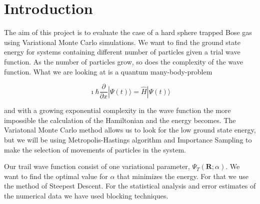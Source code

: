 \section{Introduction}
The aim of this project is to evaluate the case of a hard sphere trapped Bose gas using Variational Monte Carlo simulations. We want to find the ground state energy for systems containing different number of particles given a trial wave function. As the number of particles grow, so does the complexity of the wave function.
What we are looking at is a quantum many-body-problem

$$\imath \hbar \frac{\partial}{\partial x} |\Psi (t)\rangle = \hat{H} |\Psi (t)\rangle$$

and with a growing exponential complexity in the wave function the more impossible the calculation of the Hamiltonian and the energy becomes. The Variatonal Monte Carlo method allows us to look for the low ground state energy, but we will be using Metropolis-Hastings algorithm and Importance Sampling to make the selection of movements of particles in the system. 

Our trail wave function consist of one variational parameter, $\Psi_T(\mathbf{R};\alpha)$. We want to find the optimal value for $\alpha$ that minimizes the energy. For that we use the method of Steepest Descent. 
For the statistical analysis and error estimates of the numerical data we have used blocking techniques.  

